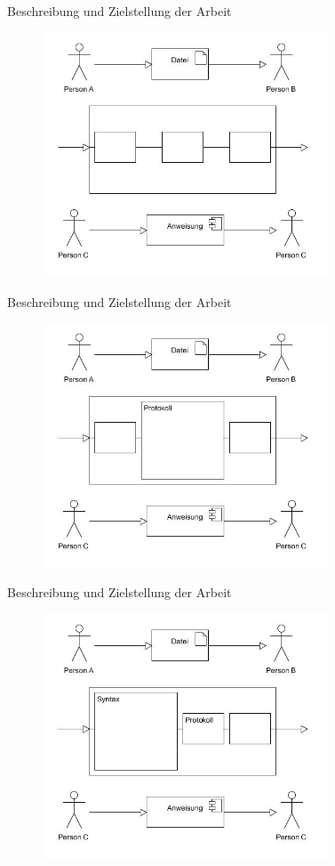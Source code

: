 \documentclass{beamer}
\begin{document}
\begin{frame}{Beschreibung und Zielstellung der Arbeit}
\begin{figure}
\includegraphics[width=8.5cm]{s2-c.jpg}
\end{figure}
\end{frame}

\begin{frame}{Beschreibung und Zielstellung der Arbeit}
\begin{figure}
\includegraphics[width=8.5cm]{s3.jpg}
\end{figure}
\end{frame}

\begin{frame}{Beschreibung und Zielstellung der Arbeit}
\begin{figure}
\includegraphics[width=8.5cm]{s4.jpg}
\end{figure}
\end{frame}
\end{document}
